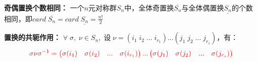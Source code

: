 \documentclass[zihao=-4,UTF8]{report}
\begin{document}
\textbf{奇偶置换个数相同：}
一个$n$元对称群$S_{n}$中，全体奇置换$\overline{S_{n}}$与全体偶置换$\underline{S_{n}} $的个数相同，即$card\;\overline{S_{n}}=card\;\underline{S_{n}}=\frac{n!}{2} $

\textbf{置换的共轭作用：}
$\forall\;\sigma,\;\nu \in S_{n},\;\text{设}\;\nu=(i_{1}\;i_{2}\;...\;i_{r_{1}})...(j_{1}\;j_{2}\;...\;j_{r_{s}})$，有：
\begin{equation*}
    \color{red}
    \sigma \nu \sigma^{-1}=
    \begin{pmatrix}
        \sigma(i_{1})&\sigma(i_{2})&...&\sigma(i_{r_{1}})
    \end{pmatrix}
    ...
    \begin{pmatrix}
        \sigma(j_{1})&\sigma(j_{2})&...&\sigma(j_{r_{s}})
    \end{pmatrix}
\end{equation*}
\vspace{-30pt}
\end{document}
